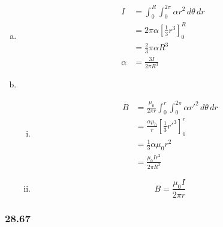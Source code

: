 \documentclass{article}
\begin{document}
\begin{enumerate}[(a)]
  \item

        \begin{align*}
          I      & = \int_0^R \int_0^{2 \pi} \alpha r^2 \,d\theta \,dr \\
                 & = 2 \pi \alpha \left[ \frac{1}{3} r^3 \right]_0^R   \\
                 & = \frac{2}{3} \pi \alpha R^3                        \\
          \alpha & = \frac{3 I}{2 \pi R^3}
        \end{align*}

  \item

        \begin{enumerate}[(i)]
          \item

                \begin{align*}
                  B & = \frac{\mu_0}{2 \pi r} \int_0^r \int_0^{2 \pi} \alpha r'^2 \,d \theta \,dr \\
                    & = \frac{\alpha \mu_0}{r} \left[ \frac{1}{3} r'^3 \right]_0^r                \\
                    & = \frac{1}{3} \alpha \mu_0 r^2                                              \\
                    & = \frac{\mu_0 I r^2}{2 \pi R^3}
                \end{align*}

          \item \[B = \frac{\mu_0 I}{2 \pi r}\]
        \end{enumerate}
\end{enumerate}

\subsubsection{28.67}
\end{document}
